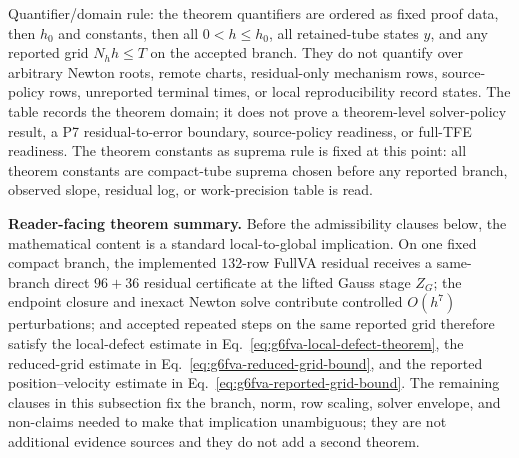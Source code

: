 \documentclass[preprint,12pt]{elsarticle}
\begin{document}
Quantifier/domain rule: the theorem quantifiers are
ordered as fixed proof data, then \(h_0\) and constants, then all
\(0<h\le h_0\), all retained-tube states \(y\), and any reported grid
\(N_hh\le T\) on the accepted branch. They do not quantify over arbitrary
Newton roots, remote charts, residual-only mechanism rows, source-policy rows,
unreported terminal times, or local reproducibility record states. The table records
the theorem domain; it does not prove a theorem-level solver-policy result,
a P7 residual-to-error boundary, source-policy readiness, or full-TFE readiness.
The theorem constants as suprema rule is fixed at this point: all theorem
constants are compact-tube suprema chosen before any reported branch, observed
slope, residual log, or work-precision table is read.

\noindent\textbf{Reader-facing theorem summary.}
Before the admissibility clauses below, the mathematical content is a standard
local-to-global implication.  On one fixed compact branch, the implemented
\(132\)-row FullVA residual receives a same-branch direct \(96+36\) residual
certificate at the lifted Gauss stage \(Z_G\); the endpoint closure and
inexact Newton solve contribute controlled \(O(h^7)\) perturbations; and
accepted repeated steps on the same reported grid therefore satisfy the
local-defect estimate in Eq.~\eqref{eq:g6fva-local-defect-theorem}, the
reduced-grid estimate in Eq.~\eqref{eq:g6fva-reduced-grid-bound}, and the
reported position--velocity estimate in Eq.~\eqref{eq:g6fva-reported-grid-bound}.
The remaining clauses in this subsection fix the branch, norm, row scaling,
solver envelope, and non-claims needed to make that implication unambiguous;
they are not additional evidence sources and they do not add a second theorem.
\end{document}
